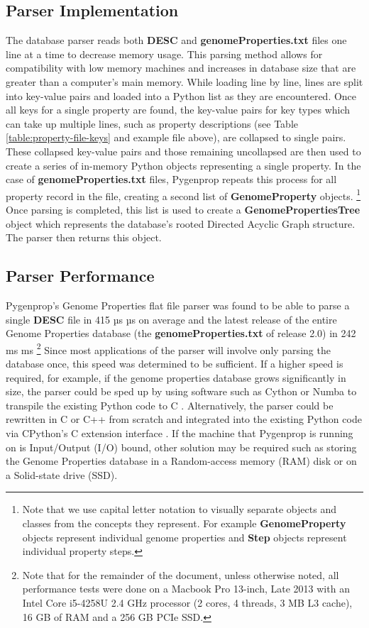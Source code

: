 \subsection{Parser Implementation}

The database parser reads both \textbf{DESC} and \textbf{genomeProperties.txt} files one line at a time to decrease memory usage. This parsing method allows for compatibility with low memory machines and increases in database size that are greater than a computer's main memory. While loading line by line, lines are split into key-value pairs and loaded into a Python list as they are encountered. Once all keys for a single property are found, the key-value pairs for key types which can take up multiple lines, such as property descriptions (see Table \ref{table:property-file-keys} and example file above), are collapsed to single pairs. These collapsed key-value pairs and those remaining uncollapsed are then used to create a series of in-memory Python objects representing a single property. In the case of \textbf{genomeProperties.txt} files, Pygenprop repeats this process for all property record in the file, creating a second list of \textbf{GenomeProperty} objects. \footnote{Note that we use capital letter notation to visually separate objects and classes from the concepts they represent. For example \textbf{GenomeProperty} objects represent individual genome properties and \textbf{Step} objects represent individual property steps.} Once parsing is completed, this list is used to create a \textbf{GenomePropertiesTree} object which represents the database's rooted Directed Acyclic Graph structure. The parser then returns this object.

\subsection{Parser Performance}

Pygenprop's Genome Properties flat file parser was found to be able to parse a single \textbf{DESC} file in 415 µs  µs on average and the latest release of the entire Genome Properties database (the \textbf{genomeProperties.txt} of release 2.0) in 242 ms  ms \footnote{Note that for the remainder of the document, unless otherwise noted, all performance tests were done on a Macbook Pro 13-inch, Late 2013 with an Intel Core i5-4258U 2.4 GHz processor (2 cores, 4 threads, 3 MB L3 cache), 16 GB of RAM and a 256 GB PCIe SSD.} Since most applications of the parser will involve only parsing the database once, this speed was determined to be sufficient. If a higher speed is required, for example, if the genome properties database grows significantly in size, the parser could be sped up by using software such as Cython \cite{behnel2010cython} or Numba \cite{lam2015numba} to transpile the existing Python code to C \cite{kernighan2006c}. Alternatively, the parser could be rewritten in C or C++ \cite{ISO:1998:IIP} from scratch and integrated into the existing Python code via CPython's C extension interface \cite{van1995python}. If the machine that Pygenprop is running on is Input/Output (I/O) bound, other solution may be required such as storing the Genome Properties database in a Random-access memory (RAM) disk or on a Solid-state drive (SSD).


